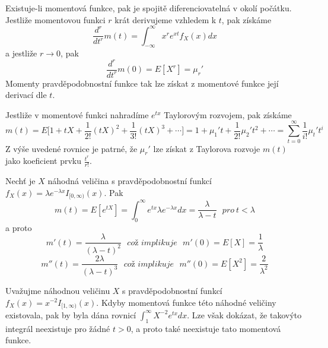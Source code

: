 Existuje-li momentová funkce, pak je spojitě diferenciovatelná v okolí počátku. Jestliže momentovou funkci $r$ krát derivujeme vzhledem k $t$, pak získáme
\begin{equation*}
\frac{d^r}{dt^r}m(t) = \int_{-\infty}^{\infty}x^r e^{xt}f_X(x)dx
\end{equation*}
a jestliže $r \rightarrow 0$, pak
\begin{equation*}
\frac{d^r}{dt^r}m(0) = E[X^r] = \mu_r'
\end{equation*}
Momenty pravděpodobnostní funkce tak lze získat z momentové funkce její derivací dle $t$.

Jestliže v momentové funkci nahradíme $e^{tx}$ Taylorovým rozvojem, pak získáme
\begin{equation*}
m(t) = E\big[1 + tX + \frac{1}{2!}(tX)^2 + \frac{1}{3!}(tX)^3 + \cdots \big] = 1 + \mu_1't + \frac{1}{2!}\mu_2't^2 + \cdots = \sum_{t = 0}^{\infty}\frac{1}{i!}\mu_t't^i
\end{equation*}
Z výše uvedené rovnice je patrné, že $\mu_r'$ lze získat z Taylorova rozvoje $m(t)$ jako koeficient prvku $\frac{t^r}{r!}$.

\begin{example}
Nechť je $X$ náhodná veličina s pravděpodobnostní funkcí $f_X(x) = \lambda e^{-\lambda x}I_{[0, \infty)}(x)$. Pak
\begin{equation*}
m(t) = E[e^{tX}] = \int_0^{\infty} e^{tx} \lambda e^{-\lambda x} dx = \frac{\lambda}{\lambda - t}~~~\textit{pro}~t < \lambda
\end{equation*}
a proto
\begin{equation*}
m'(t) = \frac{\lambda}{(\lambda - t)^2}~~~\textit{což implikuje}~~~m'(0) = E[X] = \frac{1}{\lambda}
\end{equation*}
\begin{equation*}
m''(t) = \frac{2 \lambda}{(\lambda - t)^3}~~~\textit{což implikuje}~~~m''(0) = E[X^2] = \frac{2}{\lambda^2}
\end{equation*}
\end{example}

\begin{example}
Uvažujme náhodnou veličinu $X$ s pravděpodobnostní funkcí $f_X(x) = x^{-2}I_{[1, \infty)}(x)$. Kdyby momentová funkce této náhodné veličiny existovala, pak by byla dána rovnicí $\int_1^{\infty}X^{-2}e^{tx}dx$. Lze však dokázat, že takovýto integrál neexistuje pro žádné $t > 0$, a proto také neexistuje tato momentová funkce.
\end{example}


